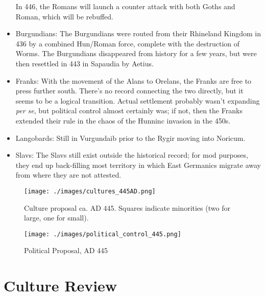 \documentclass{article}
\begin{document}
\begin{itemize}
		In 446, the Romans will launch a counter attack with both Goths and Roman, which will be rebuffed.
		
		\item Burgundians:\newline
		The Burgundians were routed from their Rhineland Kingdom in 436 by a combined Hun/Roman force, complete with the destruction of Worms. 
		The Burgundians disappeared from history for a few years, but were then resettled in 443 in Sapaudia by Aetius.
		
		\item Franks:\newline
		With the movement of the Alans to Orelans, the Franks are free to press further south.
		There's no record connecting the two directly, but it seems to be a logical transition.
		Actual settlement probably wasn't expanding \textit{per se}, but political control almost certainly was; if not, then the Franks extended their rule in the chaos of the Hunninc invasion in the 450s.
		
		\item Langobards:\newline
		Still in Vurgundaib prior to the Rygir moving into Noricum.
		
		\item Slavs:\newline
		The Slavs still exist outside the historical record; for mod purposes, they end up back-filling most territory in which East Germanics migrate away from where they are not attested.
	\end{itemize}
	
	\newpage
	
	\begin{figure}[h!]
		\centering
		\texttt{[image: ./images/cultures\_445AD.png]}
		\caption{Culture proposal ca. AD 445. Squares indicate minorities (two for large, one for small).}
	\end{figure}
	
	\begin{figure}[h!]
		\centering
		\texttt{[image: ./images/political\_control\_445.png]}
		\caption{Political Proposal, AD 445}
	\end{figure}
	
	\newpage
	
	\section{Culture Review}
	\label{sec:culture_review}
	
\end{document}

